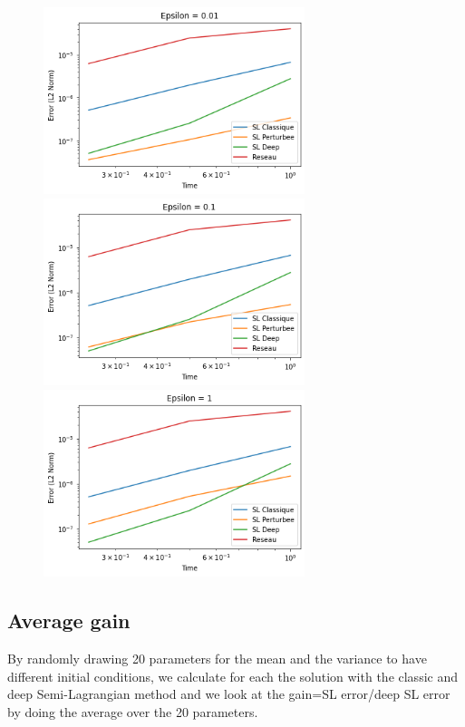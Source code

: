 \documentclass{article}
\begin{document}
\begin{figure}[!h]
    \centering
    \includegraphics[width=0.68\textwidth]{images/ep23.png}
    \includegraphics[width=0.68\textwidth]{images/ep24.png}
    \includegraphics[width=0.68\textwidth]{images/ep25.png}
\end{figure}
\newpage

\subsection{Average gain}

By randomly drawing 20 parameters for the mean and the variance to have different initial conditions, we calculate for each the solution with the classic and deep Semi-Lagrangian method and we look at the gain=SL error/deep SL error by doing the average over the 20 parameters.\newline 
\end{document}

